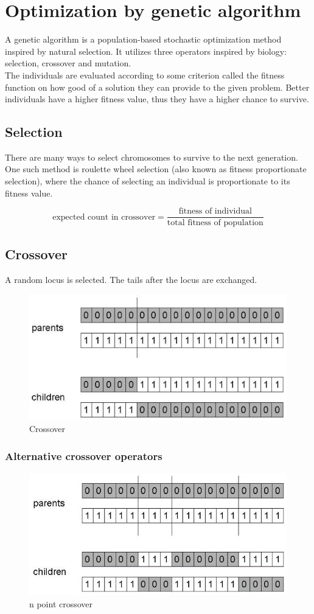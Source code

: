 \documentclass[a4paper,12pt,answers]{article}
\begin{document}
	
	
	\section{Optimization by genetic algorithm}
	A genetic algorithm is a population-based stochastic optimization method inspired by natural selection. It utilizes three operators inspired by biology: selection, crossover and mutation.
	\\[4pt]
	\noindent
	The individuals are evaluated according to some criterion called the fitness function on how good of a solution they can provide to the given problem. Better individuals have a higher fitness value, thus they have a higher chance to survive.
	
	
	\subsection{Selection}
	There are many ways to select chromosomes to survive to the next generation. One such method is roulette wheel selection (also known as fitness proportionate selection), where the chance of selecting an individual is proportionate to its fitness value.
	
	\[
	\text{expected count in crossover} = \frac{\text{fitness of individual}}{\text{total fitness of population}}
	\]
	
	\subsection{Crossover}
	A random locus is selected. The tails after the locus are exchanged.
	\begin{figure}[H]
		\centering
		\includegraphics[width=0.7\linewidth]{crossover}
		\caption{Crossover}
		\label{fig:crossover}
	\end{figure}
	
	\subsubsection{Alternative crossover operators}
	\begin{figure}[H]
		\centering
		\includegraphics[width=0.7\linewidth]{npoint_cross}
		\caption{n point crossover}
		\label{fig:npointcross}
	\end{figure}
	
\end{document}
